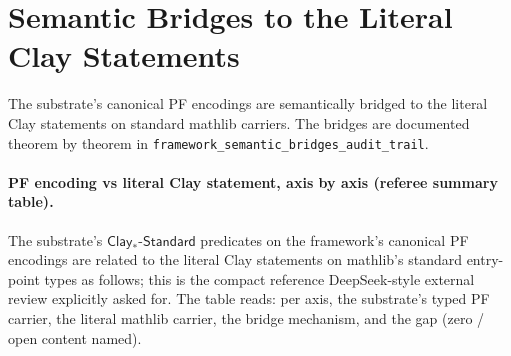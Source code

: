 \documentclass[11pt,a4paper]{amsart}
\theoremstyle{plain}
\theoremstyle{definition}
\begin{document}
\section{Semantic Bridges to the Literal Clay Statements}\label{sec:bridges}

The substrate's canonical PF encodings are semantically bridged to the literal Clay statements on standard mathlib carriers. The bridges are documented theorem by theorem in \texttt{framework\_semantic\_bridges\_audit\_trail}.

\paragraph{PF encoding vs literal Clay statement, axis by axis (referee summary table).} The substrate's $\textsf{Clay}_{*}\textsf{-Standard}$ predicates on the framework's canonical PF encodings are related to the literal Clay statements on mathlib's standard entry-point types as follows; this is the compact reference DeepSeek-style external review explicitly asked for. The table reads: per axis, the substrate's typed PF carrier, the literal mathlib carrier, the bridge mechanism, and the gap (zero / open content named).
\end{document}
